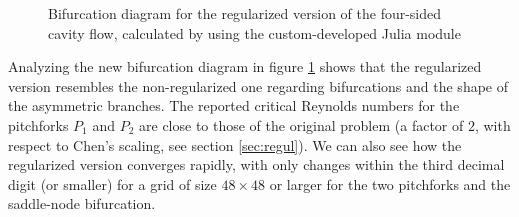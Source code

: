\begin{figure}[!htb]
  \caption{Bifurcation diagram for the regularized version of the four-sided
    cavity flow, calculated by using the custom-developed Julia module} 
  \label{fig:bif_diag}
\end{figure}

Analyzing the new bifurcation diagram in figure \ref{fig:bif_diag} shows that
the regularized version resembles the non-regularized one regarding
bifurcations and the shape of the asymmetric branches. The reported critical
Reynolds numbers for the pitchforks $P_1$ and $P_2$ are close to those of the
original problem (a factor of $2$, with respect to Chen's scaling, see section
\ref{sec:regul}). We can also see how the regularized version converges
rapidly, with only changes within the third decimal digit (or smaller) for a grid
of size $48 \times 48$ or larger for the two pitchforks and the saddle-node
bifurcation.

